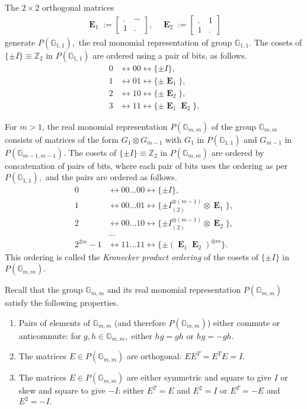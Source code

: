 \documentclass[12pt,a4paper]{article}
\newcommand{\mb}[1]{\mathbb{#1}}
\newcommand{\mf}[1]{\mathbf{#1}}
\newcommand{\oE}{\mf{\operatorname{E}}}
\newcommand{\G}{\mb{G}}
\newcommand{\Z}{\mb{Z}}
\newcommand{\Rep}{P}
\begin{document}
The $2 \times 2$ orthogonal matrices
\begin{align*}
\oE_1 :=
\left[
\begin{array}{cc}
. & - \\
1 & .
\end{array}
\right],
\quad
\oE_2 :=
\left[
\begin{array}{cc}
. & 1 \\
1 & .
\end{array}
\right]
\end{align*}
generate $\Rep(\G_{1,1}),$ the real monomial representation of group $\G_{1,1}.$
The cosets of $\{\pm I\} \equiv \Z_2$ in $\Rep(\G_{1,1})$ are
ordered using a pair of bits, as follows.
\begin{align*}
0 &\leftrightarrow 00 \leftrightarrow \{ \pm I \},
\\
1 &\leftrightarrow 01 \leftrightarrow \{ \pm \oE_1 \},
\\
2 &\leftrightarrow 10 \leftrightarrow \{ \pm \oE_2 \},
\\
3 &\leftrightarrow 11 \leftrightarrow \{ \pm \oE_1 \oE_2 \}.
\end{align*}

For $m > 1$,
the real monomial representation $\Rep(\G_{m,m})$ of the 
group $\G_{m,m}$ consists of matrices of the form $G_1 \otimes G_{m-1}$
with $G_1$ in $\Rep(\G_{1,1})$ and $G_{m-1}$ in $\Rep(\G_{m-1,m-1}).$
The cosets of $\{\pm I\} \equiv \Z_2$ in $\Rep(\G_{m,m})$ are
ordered by concatenation of pairs of bits, 
where each pair of bits uses the ordering as per $\Rep(\G_{1,1}),$
and the pairs are ordered as follows.
\begin{align*}
0 &\leftrightarrow 00 \ldots 00 \leftrightarrow \{ \pm I \},
\\
1 &\leftrightarrow 00 \ldots 01 \leftrightarrow \{ \pm I_{(2)}^{\otimes {(m-1)}} \otimes  \oE_1 \},
\\
2 &\leftrightarrow 00 \ldots 10 \leftrightarrow \{ \pm I_{(2)}^{\otimes {(m-1)}} \otimes  \oE_2 \},
\\
&\ldots
\\
2^{2m} - 1 &\leftrightarrow 11 \ldots 11 \leftrightarrow \{ \pm (\oE_1 \oE_2)^{\otimes {m}} \}.
\end{align*}
This ordering is called 
the \emph{Kronecker product ordering} of the cosets of $\{\pm I\}$ in $\Rep(\G_{m,m}).$

Recall that
the group $\G_{m,m}$ and its real monomial representation $\Rep(\G_{m,m})$ 
satisfy the following properties.
\begin{enumerate}
\item 
Pairs of elements of $\G_{m,m}$ (and therefore $\Rep(\G_{m,m})$) either commute or anti\-commute:
for $g, h \in \G_{m,m},$ either $h g = g h$ or $h g = - g h.$
\item
The matrices $E \in \Rep(\G_{m,m})$ are orthogonal: $E E^T = E^T E = I.$
\item
The matrices $E \in \Rep(\G_{m,m})$ are either symmetric and square to give $I$ or 
skew and square to give $-I$: either $E^T = E$ and $E^2 =I$ or $E^T = -E$ and $E^2 = -I.$
\end{enumerate}
\end{document}
